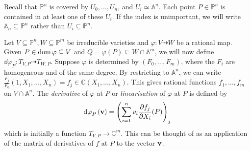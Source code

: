 Recall that \( \mathbb P^n \) is covered by \( U_0, \dots, U_n \), and \( U_i \simeq \mathbb A^n \).
Each point \( P \in \mathbb P^n \) is contained in at least one of these \( U_i \).
If the index is unimportant, we will write \( \mathbb A_n \subseteq \mathbb P^n \) rather than \( U_i \subseteq \mathbb P^n \).

Let \( V \subseteq \mathbb P^n, W \subseteq \mathbb P^m \) be irreducible varieties and \( \varphi \colon V \dashrightarrow W \) be a rational map.
Given \( P \in \operatorname{dom} \varphi \subseteq V \) and \( Q = \varphi(P) \subseteq W \cap \mathbb A^m \), we will now define \( \dd{\varphi}_P \colon T_{V,P} \dashrightarrow T_{W,P} \).
Suppose \( \varphi \) is determined by \( (F_0, \dots, F_m) \), where the \( F_i \) are homogeneous and of the same degree.
By restricting to \( \mathbb A^n \), we can write \( \frac{F_j}{F_0}(1, X_1, \dots, X_n) = f_j \in \mathbb C(X_1, \dots, X_n) \).
This gives rational functions \( f_1, \dots, f_m \) on \( V \cap \mathbb A^n \).
The \emph{derivative} of \( \varphi \) at \( P \) or \emph{linearisation} of \( \varphi \) at \( P \) is defined by
\[ \dd{\varphi}_P(\vb v) = \qty(\sum_{i=1}^n v_i \pdv{f_j}{X_i}\qty(P))_j \]
which is initially a function \( T_{V,P} \to \mathbb C^m \).
This can be thought of as an application of the matrix of derivatives of \( f \) at \( P \) to the vector \( \vb v \).
